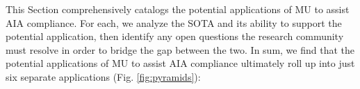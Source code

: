 This Section comprehensively catalogs the potential applications of MU to assist AIA compliance. 
For each, we analyze the SOTA and its ability to support the potential application, then identify any open questions the research community must resolve in order to bridge the gap between the two. 
In sum, we find that the potential applications of MU to assist AIA compliance ultimately roll up into just six separate applications (Fig. \ref{fig:pyramids}):
